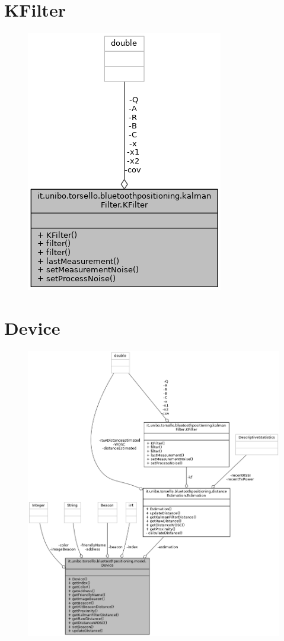 \section{KFilter}
\begin{figure}[ph]
	\centering
	\includegraphics[width=0.6\linewidth]{img/uml/class/classit_1_1unibo_1_1torsello_1_1bluetoothpositioning_1_1kalmanFilter_1_1KFilter__coll__graph.png}
	\caption{}
\end{figure}

\newpage
\section{Device}
\begin{figure}[ph]
	\centering
	\includegraphics[width=1.2\linewidth]{img/uml/class/classit_1_1unibo_1_1torsello_1_1bluetoothpositioning_1_1model_1_1Device__coll__graph.png}
	\caption{}
\end{figure}

